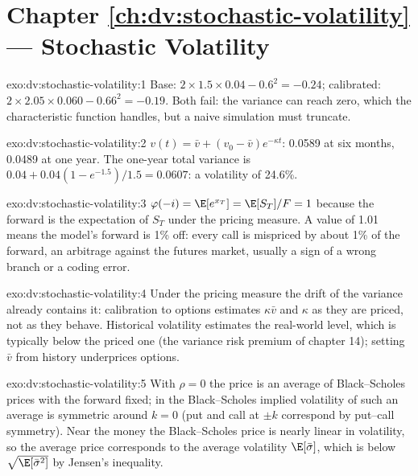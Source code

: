 \section*{Chapter \ref{ch:dv:stochastic-volatility} --- Stochastic Volatility}

\begin{solution}{exo:dv:stochastic-volatility:1}
Base: $2\times1.5\times0.04-0.6^2=-0.24$; calibrated: $2\times2.05\times0.060-0.66^2=-0.19$. Both fail: the
variance can reach zero, which the characteristic function handles, but a naive simulation must truncate.
\end{solution}

\begin{solution}{exo:dv:stochastic-volatility:2}
$v(t)=\bar v+(v_0-\bar v)e^{-\kappa t}$: 0.0589 at six months, 0.0489 at one year. The one-year total variance is
$0.04+0.04(1-e^{-1.5})/1.5=0.0607$: a volatility of 24.6\%.
\end{solution}

\begin{solution}{exo:dv:stochastic-volatility:3}
$\varphi(-i)=\E[e^{x_T}]=\E[S_T]/F=1$ because the forward is the expectation of $S_T$ under the pricing measure. A
value of 1.01 means the model's forward is 1\% off: every call is mispriced by about 1\% of the forward, an
arbitrage against the futures market, usually a sign of a wrong branch or a coding error.
\end{solution}

\begin{solution}{exo:dv:stochastic-volatility:4}
Under the pricing measure the drift of the variance already contains it: calibration to options estimates
$\kappa\bar v$ and $\kappa$ as they are priced, not as they behave. Historical volatility estimates the real-world
level, which is typically below the priced one (the variance risk premium of chapter 14); setting $\bar v$ from
history underprices options.
\end{solution}

\begin{solution}{exo:dv:stochastic-volatility:5}
With $\rho=0$ the price is an average of Black--Scholes prices with the forward fixed; in  the
Black--Scholes implied volatility of such an average is symmetric around $k=0$ (put and call at $\pm k$ correspond by
put--call symmetry). Near the money the Black--Scholes price is nearly linear in volatility, so the average price
corresponds to the average volatility $\E[\bar\sigma]$, which is below $\sqrt{\E[\bar\sigma^2]}$ by Jensen's
inequality.
\end{solution}

